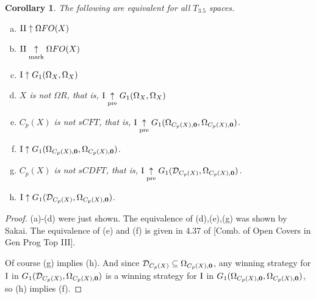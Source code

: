 \documentclass[11pt]{article}
\theoremstyle{plain}
\newtheorem{corollary}[theorem]{Corollary}
\theoremstyle{definition}
\theoremstyle{remark}
\theoremstyle{plain}
\theoremstyle{definition}
\theoremstyle{remark}
\begin{document}
\begin{corollary}
The following are equivalent for all \(T_{3.5}\) spaces.
\begin{enumerate}[a)]
\item \(\mathrm{II}\uparrow \Omega FO(X)\)
\item \(\mathrm{II}\underset{\text{mark}}{\uparrow} \Omega FO(X)\)
\item \(\mathrm{I}\uparrow G_1(\Omega_X,\Omega_X)\)
\item \(X\) is not \(\Omega R\), that is, \(\mathrm{I}\underset{\text{pre}}{\uparrow} G_1(\Omega_X,\Omega_X)\)
\item \(C_p(X)\) is not \(sCFT\), that is, 
  \(\mathrm{I}\underset{\text{pre}}{\uparrow} G_{1}(\Omega_{C_p(X),\mathbf 0},\Omega_{C_p(X),\mathbf 0})\).
\item \(\mathrm{I}\uparrow G_{1}(\Omega_{C_p(X),\mathbf 0},\Omega_{C_p(X),\mathbf 0})\).
\item \(C_p(X)\) is not \(sCDFT\), that is,
  \(\mathrm{I}\underset{\text{pre}}{\uparrow} G_{1}(\mathcal{D}_{C_p(X)},\Omega_{C_p(X),\mathbf 0})\).
\item \(\mathrm{I}\uparrow G_{1}(\mathcal{D}_{C_p(X)},\Omega_{C_p(X),\mathbf 0})\).
\end{enumerate}
\end{corollary}
\begin{proof}
(a)-(d) were just shown.
The equivalence of (d),(e),(g) was shown by Sakai.
The equivalence of (e) and (f) is given in 4.37 of [Comb. of Open Covers in Gen Prog Top III].

Of course (g) implies (h). And since \(\mathcal{D}_{C_p(X)}\subseteq\Omega_{C_p(X),\mathbf 0}\),
any winning strategy for \(\mathrm{I}\) in \(G_{1}(\mathcal{D}_{C_p(X)},\Omega_{C_p(X),\mathbf 0})\)
is a winning strategy for \(\mathrm{I}\) in 
\(G_{1}(\Omega_{C_p(X),\mathbf 0},\Omega_{C_p(X),\mathbf 0})\),
so (h) implies (f).
\end{proof}
\end{document}

